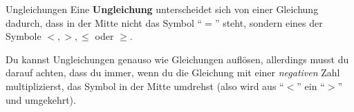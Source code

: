 \documentclass[../../main.tex]{subfiles}
\begin{document}
\begin{nutshell}{Ungleichungen}
    Eine \textbf{Ungleichung} unterscheidet sich von einer Gleichung dadurch, dass in der Mitte nicht das Symbol \enquote{$=$} steht, sondern eines der Symbole $<,>,\leq$ oder $\geq$.
    \vspace*{2mm}
    
    Du kannst Ungleichungen genauso wie Gleichungen auflösen, allerdings musst du darauf achten, dass du immer, wenn du die Gleichung mit einer \emph{negativen} Zahl multiplizierst, das Symbol in der Mitte umdrehst (also wird aus \enquote{$<$} ein \enquote{$>$} und umgekehrt).
\end{nutshell}
\end{document}
